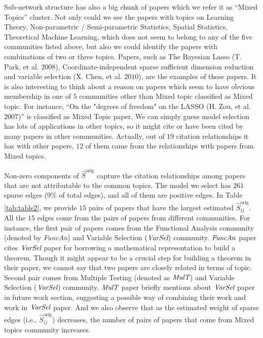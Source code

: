 \documentclass[AMS,STIX1COL]{WileyNJD-v2}
\begin{document}
{Sub-network structure has also a big chunk of papers which we refer it as ``Mixed Topics'' cluster.
Not only could we see the papers with topics on Learning Theory, Non-parametric / Semi-parametric Statistics, Spatial Statistics, Theoretical Machine Learning, which does not seem to belong to any of the five communities listed above, but also we could identify the papers with combinations of two or three topics.
Papers, such as The Bayesian Lasso (T. Park, et al. $2008$), Coordinate-independent sparse sufficient dimension reduction and variable selection (X. Chen, et al. $2010$), are the examples of these papers.
It is also interesting to think about a reason on papers which seem to have obvious membership in one of $5$ communities other than Mixed topic classified as Mixed topic.
For instance, ``On the "degrees of freedom" on the LASSO (H. Zou, et al. $2007$)'' is classified as Mixed Topic paper.
We can simply guess model selection has lots of applications in other topics, so it might cite or have been cited by many papers in other communities.
Actually, out of $19$ citation relationships it has with other papers, $12$ of them came from the relationships with papers from Mixed topics.

Non-zero components of $\widehat{S}^{\mbox{orig}}$ capture the citation relationships among papers that are not attributable to the common topics. The model we select has $261$ sparse edges ($9\%$ of total edges), and all of them are positive edges. In Table \ref{tab:table2}, we provide $15$ pairs of papers that have the largest estimated $\widehat{S}_{ij}^{\mbox{orig}}$. All the $15$ edges come from the pairs of papers from different communities. For instance, the first pair of papers comes from the Functional Analysis community (denoted by \emph{FuncAn}) and Variable Selection $(\emph{VarSel})$ community. $\emph{FuncAn}$ paper cites $\emph{VarSel}$ paper for borrowing a mathematical representation to build a theorem. Though it might appear to be a crucial step for building a theorem in their paper, we cannot say that two papers are closely related in terms of topic. Second pair comes from Multiple Testing (denoted as $\emph{MulT}$) and Variable Selection ($\emph{VarSel}$) community. $\emph{MulT}$ paper briefly mentions about $\emph{VarSel}$ paper in future work section, suggesting a possible way of combining their work and work in $\emph{VarSel}$ paper. And we also observe that as the estimated weight of sparse edges (i.e., $\widehat{S}_{ij}^{\mbox{orig}}$) decreases, the number of pairs of papers that come from Mixed topics community increases.

}
\end{document}
